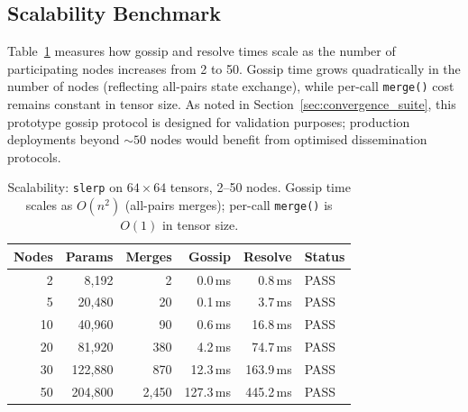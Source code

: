 \documentclass[10pt,letterpaper]{article}
\begin{document}
\subsection{Scalability Benchmark}

Table~\ref{tab:scalability} measures how gossip and resolve times scale as the number of participating nodes increases from 2 to 50.
Gossip time grows quadratically in the number of nodes (reflecting all-pairs state exchange), while per-call \texttt{merge()} cost remains constant in tensor size.
As noted in Section~\ref{sec:convergence_suite}, this prototype gossip protocol is designed for validation purposes; production deployments beyond ${\sim}50$ nodes would benefit from optimised dissemination protocols.

\begin{table}[htbp]
\centering
\caption{Scalability: \texttt{slerp} on $64 \times 64$ tensors, 2--50 nodes.
Gossip time scales as $O(n^2)$ (all-pairs merges); per-call \texttt{merge()} is $O(1)$ in tensor size.}
\label{tab:scalability}
\footnotesize
\begin{tabular}{rrrr@{\hskip 6pt}r@{\hskip 6pt}l}
\toprule
Nodes & Params & Merges & Gossip & Resolve & Status \\
\midrule
2 & 8{,}192 & 2 & 0.0\,ms & 0.8\,ms & PASS \\
5 & 20{,}480 & 20 & 0.1\,ms & 3.7\,ms & PASS \\
10 & 40{,}960 & 90 & 0.6\,ms & 16.8\,ms & PASS \\
20 & 81{,}920 & 380 & 4.2\,ms & 74.7\,ms & PASS \\
30 & 122{,}880 & 870 & 12.3\,ms & 163.9\,ms & PASS \\
50 & 204{,}800 & 2{,}450 & 127.3\,ms & 445.2\,ms & PASS \\
\bottomrule
\end{tabular}
\end{table}
\end{document}
